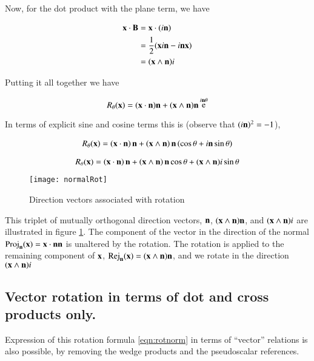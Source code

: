 \documentclass{article}      %
\DeclareMathOperator{\Rej}{Rej}
\DeclareMathOperator{\Exp}{e}
\begin{document}
Now, for the dot product with the plane term, we have

\begin{align*}
\mathbf{x} \cdot \mathbf{B}
&= \mathbf{x} \cdot (i \mathbf{n}) \\
&= \frac{1}{2}(\mathbf{x} i \mathbf{n} - i \mathbf{n} \mathbf{x}) \\
&= (\mathbf{x} \wedge \mathbf{n})i \\
\end{align*}

Putting it all together we have

\begin{equation}\label{eqn:rotexp}
R_\theta(\Bx) 
= (\Bx \cdot \Bn) \Bn + (\Bx \wedge \Bn)\Bn \Exp^{{i\Bn}\theta}
\end{equation}

In terms of explicit sine and cosine terms this is (observe that $(i\mathbf{n})^2 = -1$),

\begin{align*}
R_\theta(\mathbf{x}) 
&= \left(\mathbf{x} \cdot \mathbf{n}\right) \mathbf{n} + \left(\mathbf{x} \wedge \mathbf{n}\right)\mathbf{n} \left(\cos\theta + i\mathbf{n} \sin\theta\right) \\
\end{align*}

\begin{equation}\label{eqn:rotnorm}
R_\theta(\mathbf{x}) =
\left(\mathbf{x} \cdot \mathbf{n}\right) \mathbf{n} + \left(\mathbf{x} \wedge \mathbf{n}\right)\mathbf{n} \cos\theta + (\mathbf{x} \wedge \mathbf{n}) i \sin\theta 
\end{equation}

\begin{figure}[htp]
\centering
\texttt{[image: normalRot]}
\caption{Direction vectors associated with rotation}\label{fig:normalRot}
\end{figure}

This triplet of mutually orthogonal direction vectors, 
$\mathbf{n}$, $(\mathbf{x} \wedge \mathbf{n})\mathbf{n}$, and $(\mathbf{x} \wedge \mathbf{n}) i$
are illustrated in figure \ref{fig:normalRot}.  The component of the vector in the direction of the normal
$\operatorname{Proj}_{\mathbf{n}}(\mathbf{x}) = \mathbf{x} \cdot \mathbf{n} \mathbf{n}$ is unaltered by the rotation.
The rotation is applied to the remaining component of $\mathbf{x}$, $\Rej_{\Bn}(\Bx) = (\Bx \wedge \Bn)\Bn$, and we rotate
in the direction $(\mathbf{x} \wedge \mathbf{n}) i$

\subsection{ Vector rotation in terms of dot and cross products only. }

Expression of this rotation formula \ref{eqn:rotnorm} in terms of ``vector'' relations is also possible, by removing the wedge
products and the pseudoscalar references.
\end{document}
